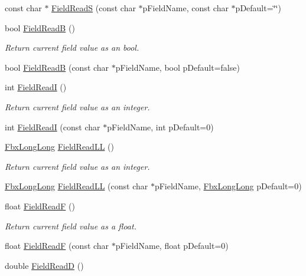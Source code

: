 \begin{Indent}
\begin{DoxyCompactItemize}
const char $\ast$ \hyperlink{class_fbx_i_o_a2357162d92bcbc9e26d6c1bd608beeb2}{Field\+ReadS} (const char $\ast$p\+Field\+Name, const char $\ast$p\+Default=\char`\"{}\char`\"{})
\item 
bool \hyperlink{class_fbx_i_o_a1007e4bf089c93e7f49988fa7087a202}{Field\+ReadB} ()
\begin{DoxyCompactList}\small\item\em Return current field value as an bool. \end{DoxyCompactList}\item 
bool \hyperlink{class_fbx_i_o_a19d9535fa286d464a72563e122e626ad}{Field\+ReadB} (const char $\ast$p\+Field\+Name, bool p\+Default=false)
\item 
int \hyperlink{class_fbx_i_o_a6fd89404042ffd3eea33c7295f6717c2}{Field\+ReadI} ()
\begin{DoxyCompactList}\small\item\em Return current field value as an integer. \end{DoxyCompactList}\item 
int \hyperlink{class_fbx_i_o_a98a0fa638e8b8b767f86a441ae45da52}{Field\+ReadI} (const char $\ast$p\+Field\+Name, int p\+Default=0)
\item 
\hyperlink{fbxtypes_8h_ac34da60c22b0a7e1156e5480da7d71f1}{Fbx\+Long\+Long} \hyperlink{class_fbx_i_o_a137305d10c734aaaccdec29340d0f354}{Field\+Read\+LL} ()
\begin{DoxyCompactList}\small\item\em Return current field value as an integer. \end{DoxyCompactList}\item 
\hyperlink{fbxtypes_8h_ac34da60c22b0a7e1156e5480da7d71f1}{Fbx\+Long\+Long} \hyperlink{class_fbx_i_o_ad18d260feb1671e93c613d5144cd1049}{Field\+Read\+LL} (const char $\ast$p\+Field\+Name, \hyperlink{fbxtypes_8h_ac34da60c22b0a7e1156e5480da7d71f1}{Fbx\+Long\+Long} p\+Default=0)
\item 
float \hyperlink{class_fbx_i_o_a17243aa477d52a239580ecf4d894dbc6}{Field\+ReadF} ()
\begin{DoxyCompactList}\small\item\em Return current field value as a float. \end{DoxyCompactList}\item 
float \hyperlink{class_fbx_i_o_a06dabe07941287f29e58ce4d09504f78}{Field\+ReadF} (const char $\ast$p\+Field\+Name, float p\+Default=0)
\item 
double \hyperlink{class_fbx_i_o_ad6d23cd45fa0a0f9867afe6d4bba6671}{Field\+ReadD} ()

\end{DoxyCompactItemize}
\end{Indent}

